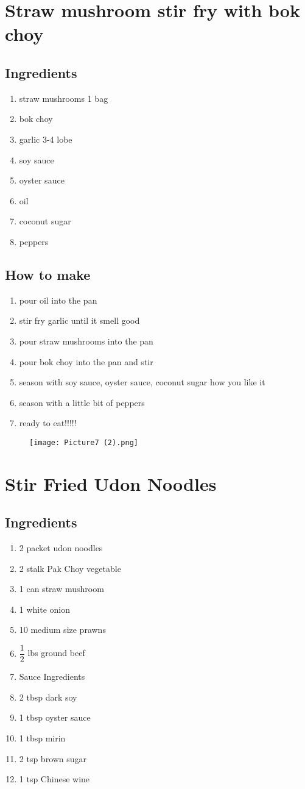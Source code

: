 \section{Straw mushroom stir fry with bok choy}
\subsection{Ingredients}
\begin{enumerate}
    \item straw mushrooms  1 bag
    \item bok choy
    \item garlic  3-4 lobe
    \item soy sauce
    \item oyster sauce
    \item oil
    \item coconut sugar
    \item peppers
\end{enumerate}
\subsection{How to make}
\begin{enumerate}
    \item pour oil into the pan
    \item stir fry garlic until it smell good
    \item pour straw mushrooms into the pan
    \item pour bok choy into the pan and stir
    \item season with soy sauce, oyster sauce, coconut sugar how you like it
    \item season with a little bit of peppers
    \item ready to eat!!!!!
\end{enumerate}
\begin{figure}[h]
    \texttt{[image: Picture7 (2).png]}
\end{figure}
\section{Stir Fried Udon Noodles}
\subsection{Ingredients}
\begin{enumerate}
    \item 2 packet udon noodles
    \item 2 stalk Pak Choy vegetable
    \item 1 can straw mushroom
    \item 1 white onion
    \item 10 medium size prawns
    \item $\dfrac{1}{2}$ lbs ground beef
    \item Sauce Ingredients
    \item 2 tbsp dark soy
    \item 1 tbsp oyster sauce
    \item 1 tbsp mirin
    \item 2 tsp brown sugar
    \item 1 tsp Chinese wine
\end{enumerate}
